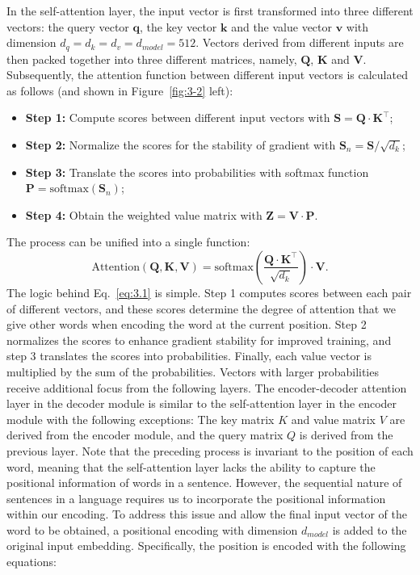 In the self-attention layer, the input vector is first transformed into three different vectors:  the query vector $\mathbf q$, the key vector $\mathbf k$ and the value vector $\mathbf v$ with dimension $d_q=d_k=d_v= d_{model}=512$. Vectors derived from different inputs are then packed together into three different matrices, namely, $\mathbf Q$, $\mathbf K$ and $\mathbf V$. Subsequently, the attention function between different input vectors is calculated as follows (and shown in Figure~\ref{fig:3-2} left):
\begin{itemize}
	\item \textbf{Step 1: }Compute scores between different input vectors with $\mathbf S=\mathbf Q\cdot \mathbf K^\top$;
	\item \textbf{Step 2: }Normalize the scores for the stability of gradient with $\mathbf S_n=\mathbf{S}/{\sqrt{d_k}}$;
	\item \textbf{Step 3: }Translate the scores into probabilities with softmax function $\mathbf P=\mathrm{softmax}(\mathbf S_n)$;
	\item \textbf{Step 4: }Obtain the weighted value matrix with $\mathbf Z=\mathbf V\cdot \mathbf P$.
\end{itemize}
The process can be unified into a single function:
\begin{equation}
\mathrm{Attention}(\mathbf Q,\mathbf K,\mathbf V)=\mathrm{softmax}(\frac{\mathbf Q\cdot \mathbf K^\top}{\sqrt{d_k}})\cdot \mathbf V.
\label{eq:3.1}
\end{equation}
The logic behind Eq.~\ref{eq:3.1} is simple. Step 1 computes scores between each pair of different vectors, and these scores determine the degree of attention that we give other words when encoding the word at the current position. Step 2 normalizes the scores to enhance gradient stability for improved training, and step 3 translates the scores into probabilities. Finally, each value vector is multiplied by the sum of the probabilities. Vectors with larger probabilities receive additional focus from the following layers.
The encoder-decoder attention layer in the decoder module is similar to the self-attention layer in the encoder module with the following exceptions: The key matrix $K$ and value matrix $V$ are derived from the encoder module, and the query matrix $Q$ is derived from the previous layer.
Note that the preceding process is invariant to the position of each word, meaning that the self-attention layer lacks the ability to capture the positional information of words in a sentence. However, the sequential nature of sentences in a language requires us to incorporate the positional information within our encoding. To address this issue and allow the final input vector of the word to be obtained, a positional encoding with dimension $d_{model}$ is added to the original input embedding. Specifically, the position is encoded with the following equations:
